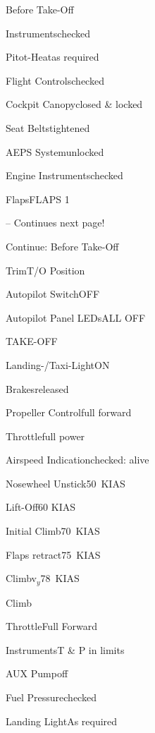 \begin{checklist}{Before Take-Off}
  \item{Instruments}{checked}
  \item{Pitot-Heat}{as required}
  \item{Flight Controls}{checked}
  \item{Cockpit Canopy}{closed \& locked}
  \item{Seat Belts}{tightened}
  \item{AEPS System}{unlocked}
  \item{Engine Instruments}{checked}
  \item{Flaps}{FLAPS 1}

-- Continues next page!
\end{checklist}
\begin{checklist}{Continue: Before Take-Off}
  \item{Trim}{T/O Position}
  \item{Autopilot Switch}{OFF}
  \item{Autopilot Panel LEDs}{ALL OFF}
\end{checklist}

\begin{checklist}{TAKE-OFF}
  \item{Landing-/Taxi-Light}{ON}
  \item{Brakes}{released}
  \item{Propeller Control}{full forward}
  \item{Throttle}{full power}
  \item{Airspeed Indication}{checked: alive}
  \item{Nosewheel Unstick}{50~KIAS}
  \item{Lift-Off}{60 KIAS}
  \item{Initial Climb}{70~KIAS}
  \item{Flaps retract}{75~KIAS}
  \item{Climb}{v$_{y}$78~KIAS} 
\end{checklist}

\begin{checklist}{Climb}
  \item{Throttle}{Full Forward}
  \item{Instruments}{T \& P in limits}
  \item{AUX Pump}{off}
  \item{Fuel Pressure}{checked}
  \item{Landing Light}{As required}
\end{checklist}

